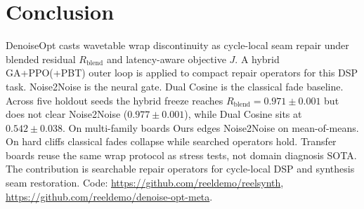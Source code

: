 \section{Conclusion}
\label{sec:conclusion}

DenoiseOpt casts wavetable wrap discontinuity as cycle-local seam repair under blended residual $R_{\mathrm{blend}}$ and latency-aware objective $J$.
A hybrid GA+PPO(+PBT) outer loop is applied to compact repair operators for this DSP task.
Noise2Noise is the neural gate. Dual Cosine is the classical fade baseline.
Across five holdout seeds the hybrid freeze reaches $R_{\mathrm{blend}}{=}0.971{\pm}0.001$ but does not clear Noise2Noise ($0.977{\pm}0.001$), while Dual Cosine sits at $0.542{\pm}0.038$.
On multi-family boards Ours edges Noise2Noise on mean-of-means. On hard cliffs classical fades collapse while searched operators hold.
Transfer boards reuse the same wrap protocol as stress tests, not domain diagnosis SOTA.
The contribution is searchable repair operators for cycle-local DSP and synthesis seam restoration.
Code: \url{https://github.com/reeldemo/reelsynth}, \url{https://github.com/reeldemo/denoise-opt-meta}.

